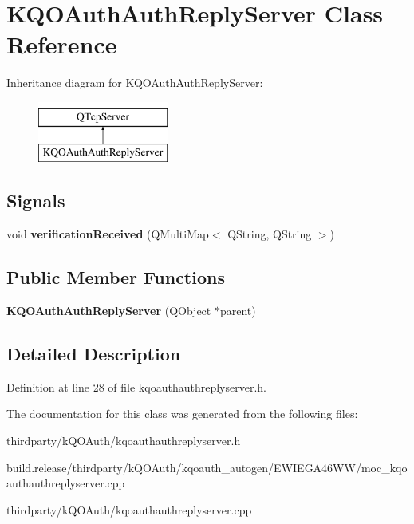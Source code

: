 \hypertarget{class_k_q_o_auth_auth_reply_server}{}\section{K\+Q\+O\+Auth\+Auth\+Reply\+Server Class Reference}
\label{class_k_q_o_auth_auth_reply_server}
Inheritance diagram for K\+Q\+O\+Auth\+Auth\+Reply\+Server\+:\begin{figure}[H]
\begin{center}
\leavevmode
\includegraphics[height=2.000000cm]{class_k_q_o_auth_auth_reply_server}
\end{center}
\end{figure}
\subsection*{Signals}
\begin{DoxyCompactItemize}
\item 
\mbox{\label{class_k_q_o_auth_auth_reply_server_a4189698588ff944e4aef806892161f62}} 
void {\bfseries verification\+Received} (Q\+Multi\+Map$<$ Q\+String, Q\+String $>$)
\end{DoxyCompactItemize}
\subsection*{Public Member Functions}
\begin{DoxyCompactItemize}
\item 
\mbox{\label{class_k_q_o_auth_auth_reply_server_a0320604ec7dd345b055b7ac10a1f0303}} 
{\bfseries K\+Q\+O\+Auth\+Auth\+Reply\+Server} (Q\+Object $\ast$parent)
\end{DoxyCompactItemize}


\subsection{Detailed Description}


Definition at line 28 of file kqoauthauthreplyserver.\+h.



The documentation for this class was generated from the following files\+:\begin{DoxyCompactItemize}
\item 
thirdparty/k\+Q\+O\+Auth/kqoauthauthreplyserver.\+h\item 
build.\+release/thirdparty/k\+Q\+O\+Auth/kqoauth\+\_\+autogen/\+E\+W\+I\+E\+G\+A46\+W\+W/moc\+\_\+kqoauthauthreplyserver.\+cpp\item 
thirdparty/k\+Q\+O\+Auth/kqoauthauthreplyserver.\+cpp\end{DoxyCompactItemize}
